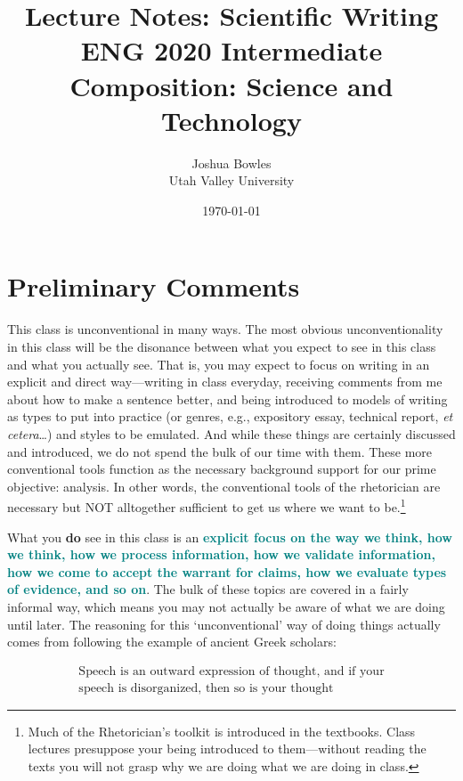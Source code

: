 \documentclass{article}
\begin{document}
\title{Lecture Notes: Scientific Writing\\
\small ENG 2020 Intermediate Composition: Science and Technology}
\author{Joshua Bowles\\
Utah Valley University}

\date{\today}
 
\maketitle

\tableofcontents
\listoffigures
\listoftables

\part{Preliminary Comments}
This class is unconventional in many ways. The most obvious unconventionality in this class will be the disonance between what you expect to see in this class and what you actually see. That is, you may expect to focus on writing in an explicit and direct way---writing in class everyday, receiving comments from me about how to make a sentence better, and being introduced to models of writing as types to put into practice (or genres, e.g., expository essay, technical report, \textsl{et cetera}\ldots) and styles to be emulated. And while these things are certainly discussed and introduced, we do not spend the bulk of our time with them. These more conventional tools function as the necessary background support for our prime objective: analysis. In other words, the conventional tools of the rhetorician are necessary but NOT alltogether sufficient to get us where we want to be.\footnote{Much of the Rhetorician's toolkit is introduced in the textbooks. Class lectures presuppose your being introduced to them---without reading the texts you will not grasp why we are doing what we are doing in class.}

What you {\bf do} see in this class is an \textcolor{teal}{\textbf{explicit focus on the way we think, how we think, how we process information, how we validate information, how we come to accept the warrant for claims, how we evaluate types of evidence, and so on}}. The bulk of these topics are covered in a fairly informal way, which means you may not actually be aware of what we are doing until later. The reasoning for this `unconventional' way of doing things actually comes from following the example of ancient Greek scholars:

\begin{equation}
\begin{split}
 \text{Speech is an outward expression of thought, and if your}\\ 
\text{speech is disorganized, then so is your thought}
\end{split}
\end{equation}
\end{document}
